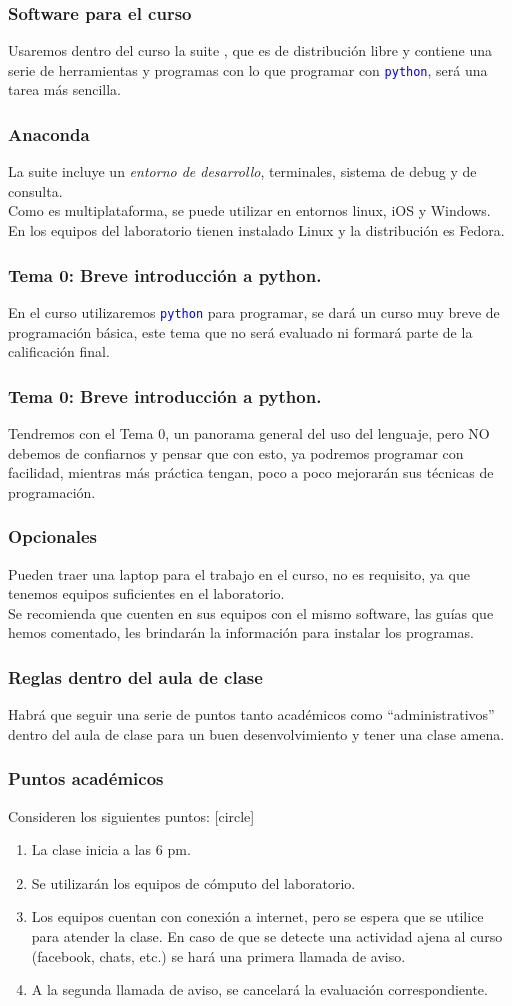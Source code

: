 \documentclass[12pt]{beamer}
\begin{document}
\begin{frame}
\frametitle{Software para el curso}
Usaremos dentro del curso la suite , que es de distribución libre y contiene una serie de herramientas y programas con lo que programar con \textcolor{blue}{\texttt{python}}, será una tarea más sencilla.
\end{frame}
\begin{frame}
\frametitle{Anaconda}
La suite incluye un \emph{entorno de desarrollo}, terminales, sistema de debug y de consulta.
\\
\bigskip
Como es multiplataforma, se puede utilizar en entornos linux, iOS y Windows. En los equipos del laboratorio tienen instalado Linux y la distribución es Fedora.
\end{frame}
\begin{frame}
\frametitle{Tema 0: Breve introducción a python.}
En el curso utilizaremos \textcolor{blue}{\texttt{python}} para programar, se dará un curso muy breve de programación básica, este tema que no será evaluado ni formará parte de la calificación final.
\end{frame}
\begin{frame}
\frametitle{Tema 0: Breve introducción a python.}
Tendremos con el Tema 0, un panorama general del uso del lenguaje, pero NO debemos de confiarnos y pensar que con esto, ya podremos programar con facilidad, mientras más práctica tengan, poco a poco mejorarán sus técnicas de programación.
\end{frame}
\begin{frame}
\frametitle{Opcionales}
Pueden traer una laptop para el trabajo en el curso, no es requisito, ya que tenemos equipos suficientes en el laboratorio.
\\
\medskip
Se recomienda que cuenten en sus equipos con el mismo software, las guías que hemos comentado, les brindarán la información para instalar los programas.
\end{frame}
\begin{frame}
\frametitle{Reglas dentro del aula de clase}
Habrá que seguir una serie de puntos tanto académicos como \enquote{administrativos} dentro del aula de clase para un buen desenvolvimiento y tener una clase amena. 
\end{frame}
\begin{frame}
\frametitle{Puntos académicos}
Consideren los siguientes puntos:
[circle]
\begin{enumerate}[<+->]
\item La clase inicia a las 6 pm.
\item Se utilizarán los equipos de cómputo del laboratorio.
\item Los equipos cuentan con conexión a internet, pero se espera que se utilice para atender la clase. En caso de que se detecte una actividad ajena al curso (facebook, chats, etc.) se hará una primera llamada de aviso.
\item A la segunda llamada de aviso, se cancelará la evaluación correspondiente.
\end{enumerate}
\end{frame}
\end{document}
